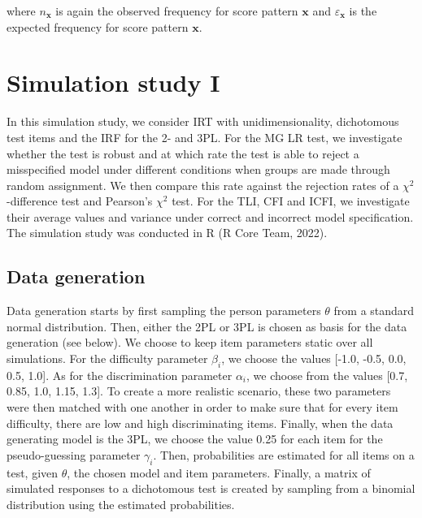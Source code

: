 \documentclass[Royal,sageapa,times,doublespace]{sagej}
\begin{document}
where $n_{\boldsymbol{x}}$ is again the observed frequency for score pattern $\boldsymbol{x}$ and $\varepsilon_{\boldsymbol{x}}$ is the expected frequency for score pattern $\boldsymbol{x}$. 

\section{Simulation study I}

In this simulation study, we consider IRT with unidimensionality, dichotomous test items and the IRF for the 2- and 3PL. For the MG LR test, we investigate whether the test is robust and at which rate the test is able to reject a misspecified model under different conditions when groups are made through random assignment. We then compare this rate against the rejection rates of a $\chi^2$-difference test and Pearson's $\chi^2$ test. For the TLI, CFI and ICFI, we investigate their average values and variance under correct and incorrect model specification. The simulation study was conducted in R (R Core Team, 2022).
\subsection{Data generation}
Data generation starts by first sampling the person parameters $\theta$ from a standard normal distribution. Then, either the 2PL or 3PL is chosen as basis for the data generation (see below). We choose to keep item parameters static over all simulations. For the difficulty parameter $\beta_i$, we choose the values [-1.0, -0.5, 0.0, 0.5, 1.0]. As for the discrimination parameter $\alpha_i$, we choose from the values [0.7, 0.85, 1.0, 1.15, 1.3]. To create a more realistic scenario, these two parameters were then matched with one another in order to make sure that for every item difficulty, there are low and high discriminating items. Finally, when the data generating model is the 3PL, we choose the value 0.25 for each item for the pseudo-guessing parameter $\gamma_i$. Then, probabilities are estimated for all items on a test, given $\theta$, the chosen model and item parameters. Finally, a matrix of simulated responses to a dichotomous test is created by sampling from a binomial distribution using the estimated probabilities. 
\end{document}
